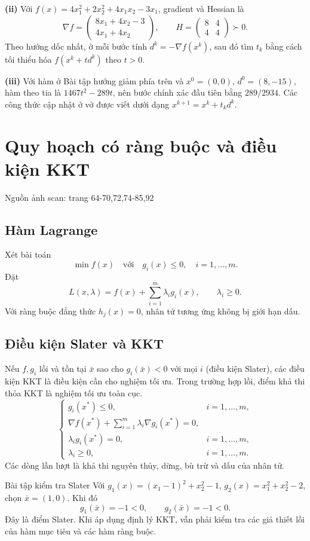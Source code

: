 \documentclass[11pt,a4paper]{article}
\newcommand{\grad}{\nabla}
\newcommand{\src}[1]{\hfill{\footnotesize\color{gray}Nguồn ảnh scan: trang #1}}
\begin{document}
\textbf{(ii)} Với \(f(x)=4x_1^2+2x_2^2+4x_1x_2-3x_1\), gradient và Hessian là
\[
\grad f=\begin{pmatrix}8x_1+4x_2-3\\4x_1+4x_2\end{pmatrix},\qquad
H=\begin{pmatrix}8&4\\4&4\end{pmatrix}\succ0.
\]
Theo hướng dốc nhất, ở mỗi bước tính \(d^k=-\grad f(x^k)\), sau đó tìm \(t_k\) bằng cách tối thiểu hóa \(f(x^k+t d^k)\) theo \(t>0\).

\textbf{(iii)} Với hàm ở Bài tập hướng giảm phía trên và \(x^0=(0,0)\), \(d^0=(8,-15)\), hàm theo tia là \(1467t^2-289t\), nên bước chính xác đầu tiên bằng \(289/2934\). Các công thức cập nhật ở vở được viết dưới dạng \(x^{k+1}=x^k+t_kd^k\).

\section{Quy hoạch có ràng buộc và điều kiện KKT}
\src{64-70,72,74-85,92}

\subsection{Hàm Lagrange}
Xét bài toán
\[
\min f(x)\quad\text{với}\quad g_i(x)\le0,\quad i=1,\ldots,m.
\]
Đặt
\[
L(x,\lambda)=f(x)+\sum_{i=1}^m\lambda_i g_i(x),
\qquad \lambda_i\ge0.
\]
Với ràng buộc đẳng thức \(h_j(x)=0\), nhân tử tương ứng không bị giới hạn dấu.

\subsection{Điều kiện Slater và KKT}
Nếu \(f,g_i\) lồi và tồn tại \(\bar x\) sao cho \(g_i(\bar x)<0\) với mọi \(i\) (điều kiện Slater), các điều kiện KKT là điều kiện cần cho nghiệm tối ưu. Trong trường hợp lồi, điểm khả thi thỏa KKT là nghiệm tối ưu toàn cục.
\[
\begin{cases}
g_i(x^*)\le0,&i=1,\ldots,m,\\
\grad f(x^*)+\displaystyle\sum_{i=1}^m\lambda_i\grad g_i(x^*)=0,\\
\lambda_i g_i(x^*)=0,&i=1,\ldots,m,\\
\lambda_i\ge0,&i=1,\ldots,m.
\end{cases}
\]
Các dòng lần lượt là khả thi nguyên thủy, dừng, bù trừ và dấu của nhân tử.

\begin{exbox}{Bài tập kiểm tra Slater}
Với \(g_1(x)=(x_1-1)^2+x_2^2-1\), \(g_2(x)=x_1^2+x_2^2-2\), chọn \(\bar x=(1,0)\). Khi đó
\[
g_1(\bar x)=-1<0,\qquad g_2(\bar x)=-1<0.
\]
Đây là điểm Slater. Khi áp dụng định lý KKT, vẫn phải kiểm tra các giả thiết lồi của hàm mục tiêu và các hàm ràng buộc.
\end{exbox}
\end{document}
